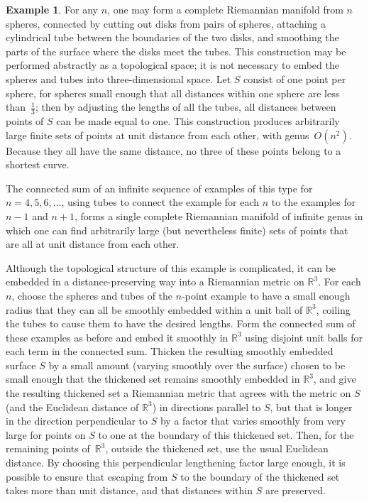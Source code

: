 \documentclass[11pt]{article}
\theoremstyle{definition}
\newtheorem{example}{Example}
\begin{document}
\begin{example}
\label{ex:high-genus}
For any $n$, one may form a complete Riemannian manifold from $n$ spheres, connected by cutting out disks from pairs of spheres, attaching a cylindrical tube between the boundaries of the two disks, and smoothing the parts of the surface where the disks meet the tubes. This construction may be performed abstractly as a topological space; it is not necessary to embed the spheres and tubes into three-dimensional space. Let $S$ consist of one point per sphere, for spheres small enough that all distances within one sphere are less than~$\tfrac13$; then by adjusting the lengths of all the tubes, all distances between points of $S$ can be made equal to one. This construction produces arbitrarily large finite sets of points at unit distance from each other, with genus~$O(n^2)$. Because they all have the same distance, no three of these points belong to a shortest curve.

The connected sum of an infinite sequence of examples of this type for $n=4,5,6,\dots$, using tubes to connect the example for each $n$ to the examples for $n-1$ and $n+1$, forms a single complete Riemannian manifold of infinite genus in which one can find arbitrarily large (but nevertheless finite) sets of points that are all at unit distance from each other.

Although the topological structure of this example is complicated, it can be embedded in a distance-preserving way into a Riemannian metric on $\mathbb{R}^3$. For each $n$, choose the spheres and tubes of the $n$-point example to have a small enough radius that they can all be smoothly embedded within a unit ball of $\mathbb{R}^3$, coiling the tubes to cause them to have the desired lengths. Form the connected sum of these examples as before and embed it smoothly in $\mathbb{R}^3$ using disjoint unit balls for each term in the connected sum. Thicken the resulting smoothly embedded surface $S$ by a small amount (varying smoothly over the surface) chosen to be small enough that the thickened set remains smoothly embedded in $\mathbb{R}^3$, and give the resulting thickened set a Riemannian metric that agrees with the metric on $S$ (and the Euclidean distance of $\mathbb{R}^3$) in directions parallel to $S$, but that is longer in the direction perpendicular to $S$ by a factor that varies smoothly from very large for points on $S$ to one at the boundary of this thickened set. Then, for the remaining points of~$\mathbb{R}^3$, outside the thickened set, use the usual Euclidean distance. By choosing this perpendicular lengthening factor large enough, it is possible to ensure that escaping from $S$ to the boundary of the thickened set takes more than unit distance, and that distances within $S$ are preserved.
\end{example}
\end{document}
